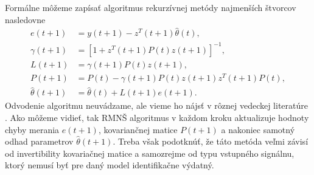 Formálne môžeme zapísať algoritmus rekurzívnej metódy najmenších štvorcov nasledovne
\begin{equation}
	\begin{split}
		e(t+1) &= y(t+1) - z^T(t+1)\hat{\theta}(t), \\
		\gamma(t+1) &= \left[ 1 + z^T(t+1)P(t)z(t+1) \right]^{-1}, \\
		L(t+1) &= \gamma(t+1)P(t)z(t+1), \\
		P(t+1) &= P(t) - \gamma(t+1)P(t)z(t+1)z^T(t+1)P(t), \\
		\hat{\theta}(t+1) &= \hat{\theta}(t) + L(t+1)e(t+1). 
	\end{split}
\end{equation}
Odvodenie algoritmu neuvádzame, ale vieme ho nájsť v rôznej vedeckej literatúre \cite{fikar:identifikacia:1999}. Ako môžeme vidieť, tak RMNŠ algoritmus v každom kroku aktualizuje hodnoty chyby merania $ e(t+1) $, kovariančnej matice $ P(t+1) $ a nakoniec samotný odhad parametrov $ \hat{\theta}(t+1) $. Treba však podotknúť, že táto metóda veľmi závisí od invertibility kovariačnej matice a samozrejme od typu vstupného signálnu, ktorý nemusí byť pre daný model identifikačne výdatný.



